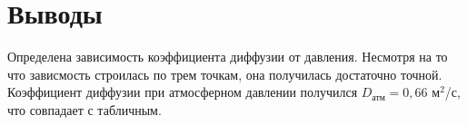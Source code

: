 \section{Выводы}
Определена зависимость коэффициента диффузии от давления. Несмотря на то что зависмость строилась по трем точкам, она получилась достаточно точной. Коэффициент диффузии при атмосферном давлении получился $D_\text{атм} = 0,66$ м$^2$/с, что совпадает с табличным.
